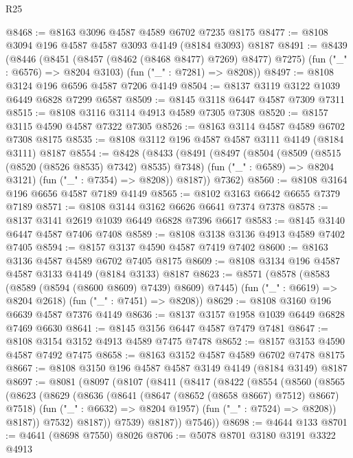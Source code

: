 \begin{lexlean}{R25}
\begin{coremodule}
@8468 := @8163 @3096 @4587 @4589 @6702 @7235 @8175
@8477 := @8108 @3094 @196 @4587 @4587 @3093 @4149 (@8184 @3093) @8187
@8491 := @8439
    (@8446
      (@8451 (@8457 (@8462 (@8468 @8477) @7269) @8477) @7275)
      (fun ("_" : @6576) => @8204 @3103)
      (fun ("_" : @7281) => @8208))
@8497 := @8108 @3124 @196 @6596 @4587 @7206 @4149
@8504 := @8137 @3119 @3122 @1039 @6449 @6828 @7299 @6587
@8509 := @8145 @3118 @6447 @4587 @7309 @7311
@8515 := @8108 @3116 @3114 @4913 @4589 @7305 @7308
@8520 := @8157 @3115 @4590 @4587 @7322 @7305
@8526 := @8163 @3114 @4587 @4589 @6702 @7308 @8175
@8535 := @8108 @3112 @196 @4587 @4587 @3111 @4149 (@8184 @3111) @8187
@8554 := @8428
    (@8433
      (@8491
        (@8497
          (@8504
            (@8509 (@8515 (@8520 (@8526 @8535) @7342) @8535) @7348)
            (fun ("_" : @6589) => @8204 @3121)
            (fun ("_" : @7354) => @8208))
          @8187))
      @7362)
@8560 := @8108 @3164 @196 @6656 @4587 @7189 @4149
@8565 := @8102 @3163 @6642 @6655 @7379 @7189
@8571 := @8108 @3144 @3162 @6626 @6641 @7374 @7378
@8578 := @8137 @3141 @2619 @1039 @6449 @6828 @7396 @6617
@8583 := @8145 @3140 @6447 @4587 @7406 @7408
@8589 := @8108 @3138 @3136 @4913 @4589 @7402 @7405
@8594 := @8157 @3137 @4590 @4587 @7419 @7402
@8600 := @8163 @3136 @4587 @4589 @6702 @7405 @8175
@8609 := @8108 @3134 @196 @4587 @4587 @3133 @4149 (@8184 @3133) @8187
@8623 := @8571
    (@8578
      (@8583 (@8589 (@8594 (@8600 @8609) @7439) @8609) @7445)
      (fun ("_" : @6619) => @8204 @2618)
      (fun ("_" : @7451) => @8208))
@8629 := @8108 @3160 @196 @6639 @4587 @7376 @4149
@8636 := @8137 @3157 @1958 @1039 @6449 @6828 @7469 @6630
@8641 := @8145 @3156 @6447 @4587 @7479 @7481
@8647 := @8108 @3154 @3152 @4913 @4589 @7475 @7478
@8652 := @8157 @3153 @4590 @4587 @7492 @7475
@8658 := @8163 @3152 @4587 @4589 @6702 @7478 @8175
@8667 := @8108 @3150 @196 @4587 @4587 @3149 @4149 (@8184 @3149) @8187
@8697 := @8081
    (@8097
      (@8107
        (@8411
          (@8417
            (@8422
              (@8554
                (@8560
                  (@8565
                    (@8623
                      (@8629
                        (@8636
                          (@8641 (@8647 (@8652 (@8658 @8667) @7512) @8667) @7518)
                          (fun ("_" : @6632) => @8204 @1957)
                          (fun ("_" : @7524) => @8208))
                        @8187))
                    @7532)
                  @8187))
              @7539)
            @8187))
        @7546))
@8698 := @4644 @133
@8701 := @4641 (@8698 @7550) @8026
@8706 := @5078 @8701 @3180 @3191 @3322 @4913

\end{coremodule}
\end{lexlean}
